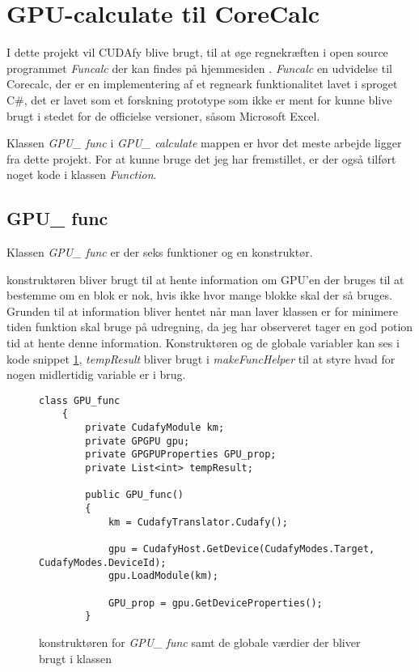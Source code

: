 \section{GPU-calculate til CoreCalc}
I dette projekt vil CUDAfy blive brugt, til at øge regnekræften i open source programmet \textit{Funcalc} der kan findes på hjemmesiden \cite{FuncalcHome}.
\textit{Funcalc} en udvidelse til Corecalc, der er en implementering af et regneark funktionalitet lavet i sproget C\#, det er lavet som et forskning prototype som ikke er ment for kunne blive brugt i stedet for de officielse versioner, såsom Microsoft Excel.

Klassen \textit{GPU\_ func} i \textit{GPU\_ calculate} mappen er hvor det meste arbejde ligger fra dette projekt. For at kunne bruge det jeg har fremstillet, er der også tilført noget kode i klassen \textit{Function}.

\subsection{GPU\_ func}
Klassen \textit{GPU\_ func} er der seks funktioner og en konstruktør.

konstruktøren bliver brugt til at hente information om GPU'en der bruges til at bestemme om en blok er nok, hvis ikke hvor mange blokke skal der så bruges. Grunden til at information bliver hentet når man laver klassen er for minimere tiden funktion skal bruge på udregning, da jeg har observeret tager en god potion tid at hente denne information. Konstruktøren og de globale variabler kan ses i kode snippet \ref{fig:GPU_func_K}, \textit{tempResult} bliver brugt i \textit{makeFuncHelper} til at styre hvad for nogen midlertidig variable er i brug.

\begin{figure}[!ht]
    \centering
    \lstset{style=sharpc}
	\begin{lstlisting}
class GPU_func
    {
        private CudafyModule km;
        private GPGPU gpu;
        private GPGPUProperties GPU_prop;
        private List<int> tempResult;
        
        public GPU_func()
        {
            km = CudafyTranslator.Cudafy();

            gpu = CudafyHost.GetDevice(CudafyModes.Target, CudafyModes.DeviceId);
            gpu.LoadModule(km);

            GPU_prop = gpu.GetDeviceProperties();
        }
	\end{lstlisting}
    \caption{konstruktøren for \textit{GPU\_ func} samt de globale værdier der bliver brugt i klassen}
    \label{fig:GPU_func_K}
\end{figure}

